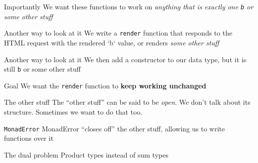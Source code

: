 \begin{frame}[fragile]
\begin{block}{Importantly}
We want these functions to work on \emph{anything that is exactly one \lstinline{b} or some other stuff}
\end{block}
\end{frame}

\begin{frame}[fragile]
\begin{block}{Another way to look at it}
We write a \lstinline{render} function that responds to the HTML request with the rendered `b` value, or renders \emph{some other stuff}
\end{block}
\end{frame}

\begin{frame}[fragile]
\begin{block}{Another way to look at it}
We then add a constructor to our data type, but it is still \lstinline{b} or some other stuff
\end{block}
\end{frame}

\begin{frame}[fragile]
\begin{block}{Goal}
We want the \lstinline{render} function to \textbf{keep working unchanged}
\end{block}
\end{frame}

\begin{frame}[fragile]
\begin{block}{The other stuff}
The ``other stuff'' can be said to be \emph{open}. We don't talk about its structure. Sometimes we want to do that too.
\end{block}
\end{frame}

\begin{frame}[fragile]
\begin{block}{\lstinline{MonadError}}
MonadError ``closes off'' the other stuff, allowing us to write functions over it
\end{block}
\end{frame}

\begin{frame}[fragile]
\begin{block}{The dual problem}
Product types instead of sum types
\end{block}
\end{frame}

